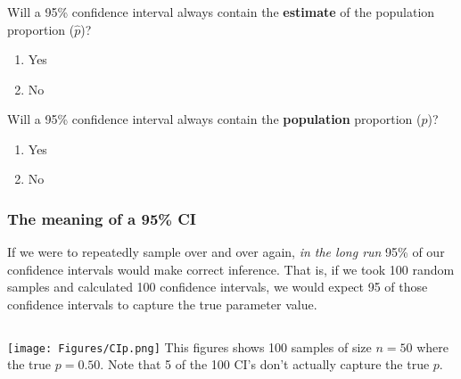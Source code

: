 \begin{frame}
\frametitle{\grp}
\begin{clicker}{Will a 95\% confidence interval always contain the \textbf{estimate} of the population proportion ($\hat{p}$)?}
\begin{enumerate}
    \item
    Yes
    \item
    No
\end{enumerate}
\end{clicker}
\vskip20pt
\begin{clicker}{Will a 95\% confidence interval always contain the \textbf{population} proportion ($p$)?}
\begin{enumerate}
    \item
    Yes
    \item
    No
\end{enumerate}
\end{clicker}
\end{frame}


\begin{frame}
\frametitle{The meaning of a 95\% CI}
If we were to repeatedly sample over and over again, \emph{in the long run} 95\% of our confidence intervals would make correct inference.
That is, if we took 100 random samples and calculated 100 confidence intervals, we would expect 95 of those confidence intervals to capture the true parameter value.
\begin{columns}
\texttt{[image: Figures/CIp.png]}
This figures shows 100 samples of size $n=50$ where the true $p=0.50$.  Note that 5 of the 100 CI's don't actually capture the true $p$.
\end{columns}
\end{frame}


